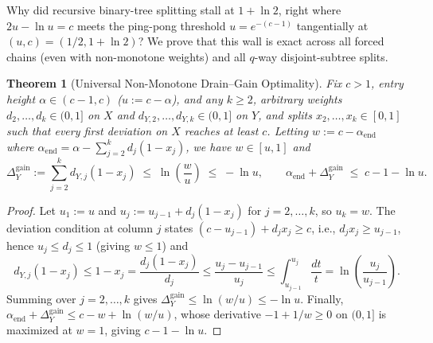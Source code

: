 \documentclass[11pt]{article}
\newtheorem{theorem}{Theorem}
\theoremstyle{definition}
\newcommand{\disc}{\Delta}
\begin{document}
Why did recursive binary-tree splitting stall at $1+\ln 2$, right where $2u-\ln u=c$ meets the ping-pong threshold $u=e^{-(c-1)}$ tangentially at $(u,c)=(1/2,1+\ln 2)$? We prove that this wall is exact across all forced chains (even with non-monotone weights) and all $q$-way disjoint-subtree splits.

\begin{theorem}[Universal Non-Monotone Drain--Gain Optimality]\label{thm:nonmonotone}
Fix $c>1$, entry height $\alpha\in(c-1,c)$ ($u:=c-\alpha$), and any $k\ge 2$, arbitrary weights $d_2,\dots,d_k\in(0,1]$ on $X$ and $d_{Y,2},\dots,d_{Y,k}\in(0,1]$ on $Y$, and splits $x_2,\dots,x_k\in[0,1]$ such that every first deviation on $X$ reaches at least $c$. Letting $w:=c-\alpha_{\mathrm{end}}$ where $\alpha_{\mathrm{end}}=\alpha-\sum_{j=2}^k d_j(1-x_j)$, we have $w\in[u,1]$ and
\[
 \disc_Y^{\mathrm{gain}} := \sum_{j=2}^k d_{Y,j}(1-x_j) \;\le\; \ln\!\left(\frac{w}{u}\right) \;\le\; -\ln u,
 \qquad \alpha_{\mathrm{end}}+\disc_Y^{\mathrm{gain}} \;\le\; c-1-\ln u.
\]
\end{theorem}
\begin{proof}
Let $u_1:=u$ and $u_j:=u_{j-1}+d_j(1-x_j)$ for $j=2,\dots,k$, so $u_k=w$. The deviation condition at column $j$ states $(c-u_{j-1})+d_j x_j\ge c$, i.e., $d_j x_j\ge u_{j-1}$, hence $u_j\le d_j\le 1$ (giving $w\le 1$) and
\[
 d_{Y,j}(1-x_j)\le 1-x_j = \frac{d_j(1-x_j)}{d_j} \le \frac{u_j - u_{j-1}}{u_j} \le \int_{u_{j-1}}^{u_j}\frac{dt}{t} = \ln\!\left(\frac{u_j}{u_{j-1}}\right).
\]
Summing over $j=2,\dots,k$ gives $\disc_Y^{\mathrm{gain}}\le \ln(w/u)\le -\ln u$. Finally, $\alpha_{\mathrm{end}}+\disc_Y^{\mathrm{gain}}\le c-w+\ln(w/u)$, whose derivative $-1+1/w\ge 0$ on $(0,1]$ is maximized at $w=1$, giving $c-1-\ln u$.
\end{proof}
\end{document}
